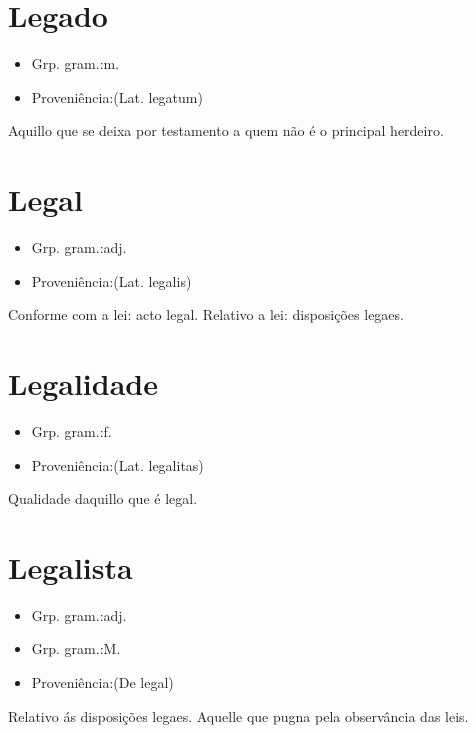 \section{Legado}
\begin{itemize}
\item {Grp. gram.:m.}
\end{itemize}
\begin{itemize}
\item {Proveniência:(Lat. \textunderscore legatum\textunderscore )}
\end{itemize}
Aquillo que se deixa por testamento a quem não é o principal herdeiro.
\section{Legal}
\begin{itemize}
\item {Grp. gram.:adj.}
\end{itemize}
\begin{itemize}
\item {Proveniência:(Lat. \textunderscore legalis\textunderscore )}
\end{itemize}
Conforme com a lei: \textunderscore acto legal\textunderscore .
Relativo a lei: \textunderscore disposições legaes\textunderscore .
\section{Legalidade}
\begin{itemize}
\item {Grp. gram.:f.}
\end{itemize}
\begin{itemize}
\item {Proveniência:(Lat. \textunderscore legalitas\textunderscore )}
\end{itemize}
Qualidade daquillo que é legal.
\section{Legalista}
\begin{itemize}
\item {Grp. gram.:adj.}
\end{itemize}
\begin{itemize}
\item {Grp. gram.:M.}
\end{itemize}
\begin{itemize}
\item {Proveniência:(De \textunderscore legal\textunderscore )}
\end{itemize}
Relativo ás disposições legaes.
Aquelle que pugna pela observância das leis.
